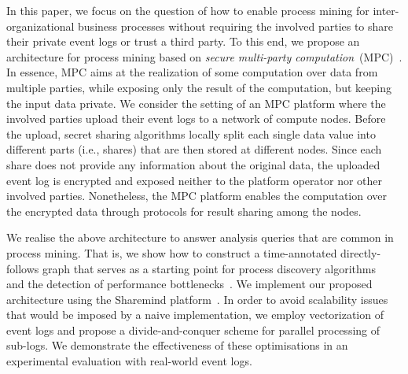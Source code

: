 

In this paper, we focus on the question of how to enable process mining for 
inter-organizational business processes without requiring the involved parties 
to share their private event logs or trust a third party.
To this end, we propose an architecture for process mining based 
on \emph{secure multi-party computation}~(MPC)~\cite{yao1982protocols}. In essence, MPC aims 
at the realization of some computation over data from multiple parties, while
exposing only the result of the computation, but keeping the input data 
private. 
We consider the setting of an MPC platform where the 
involved parties upload their event logs to a network of compute nodes. 
Before the upload, secret sharing algorithms locally 
split each single data value into different parts (i.e., shares) that are then 
stored at different nodes. Since each share does not provide any 
information about the original data, the uploaded event log is encrypted and 
exposed neither to the platform operator nor other involved parties. 
Nonetheless, the MPC platform enables the computation over the encrypted data 
through protocols for result sharing among the nodes. 

We realise the above architecture to answer analysis queries that are common in 
process mining. That is, we show how to construct a time-annotated 
directly-follows graph that serves as a starting point for process discovery 
algorithms~\cite{augusto2018automated} and the detection of performance bottlenecks~\cite{van2011time}. We 
implement our proposed architecture using the Sharemind 
platform~\cite{bogdanov2008sharemind}. In order to avoid scalability issues 
that would be imposed by a naive implementation, we employ vectorization of 
event logs and propose a divide-and-conquer scheme for parallel 
processing of sub-logs. We demonstrate the effectiveness of these optimisations 
in an experimental evaluation with real-world event logs. 

